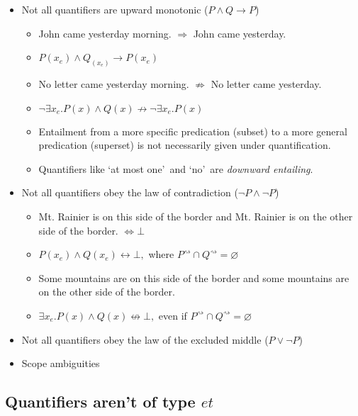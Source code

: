 \documentclass[a4paper]{article}
\begin{document}
\begin{itemize}
	\item Not all quantifiers are upward monotonic ($P \land Q \rightarrow P$)
	\begin{itemize}
		\item John came yesterday morning. $\Rightarrow$ John came yesterday.
		\item $P(x_e) \land Q_(x_e) \rightarrow P(x_e)$
		\item No letter came yesterday morning. $\not\Rightarrow$ No letter came yesterday.
		\item $\neg\exists x_e.P(x) \land Q(x) \not\rightarrow \neg\exists x_e.P(x)$
		\item Entailment from a more specific predication (subset) to a more general predication (superset) is not necessarily given under quantification.
		\item Quantifiers like \lq at most one\rq\ and \lq no\rq\ are \emph{downward entailing}.
	\end{itemize}

	\item Not all quantifiers obey the law of contradiction ($\neg P \land \neg P$)
	\begin{itemize}
		\item Mt. Rainier is on this side of the border and Mt. Rainier is on the other side of the border. $\Leftrightarrow \bot$
		\item $P(x_e) \land Q(x_e) \leftrightarrow \bot,$ where $P^\rightsquigarrow \cap Q^\rightsquigarrow = \varnothing$
		\item Some mountains are on this side of the border and some mountains are on the other side of the border.
		\item $\exists x_e.P(x) \land Q(x) \not \leftrightarrow \bot,$ even if $P^\rightsquigarrow \cap Q^\rightsquigarrow = \varnothing$
	\end{itemize}

	\item Not all quantifiers obey the law of the excluded middle ($P \lor \neg P$)

	\begin{itemize}
		
	\end{itemize}

	\item Scope ambiguities
\end{itemize}

\subsection{Quantifiers aren't of type $et$}
\end{document}
